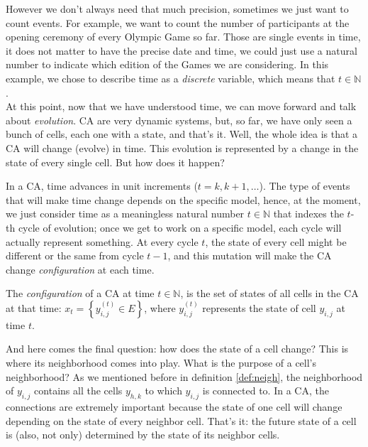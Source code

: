 However we don't always need that much precision, sometimes we just want to count events. For example,
we want to count the number of participants at the opening ceremony of every Olympic Game so far.
Those are single events in time, it does not matter to have the precise date and time, we could
just use a natural number to indicate which edition of the Games we are considering. In this example,
we chose to describe time as a \textit{discrete} variable, which means that $t \in \mathbb{N}$.\\

At this point, now that we have understood time, we can move forward and talk about \textit{evolution}.
CA are very dynamic systems, but, so far, we have only seen a bunch of cells, each one with a state, and
that's it. Well, the whole idea is that a CA will change (evolve) in time. This evolution is
represented by a change in the state of every single cell. But how does it happen?

In a CA, time advances in unit increments ($t=k, k+1, \dots$). 
The type of events that will make time change depends on the specific model,
hence, at the moment, we just consider time as a meaningless natural number $t \in \mathbb{N}$
that indexes the $t$-th cycle of evolution; once we get to work on a specific model, each cycle will
actually represent something.
At every cycle $t$,
the state of every cell might be different or the same from cycle $t-1$, and this mutation will make
the CA change \textit{configuration} at each time.

\begin{definition}[CA configuration]
The \textit{configuration} of a CA at time $t \in \mathbb{N}$, is the set of states of all cells
in the CA at that time: $x_t = \left\{ y^{(t)}_{i,j} \in E \right\}$, where
$y^{(t)}_{i,j}$ represents the state of cell $y_{i,j}$ at time $t$.
\end{definition}

And here comes the final question: how does the state of a cell change? This is where its
neighborhood comes into play.
What is the purpose of a cell's neighborhood? As we mentioned before in definition \ref{def:neigh},
the neighborhood of $y_{i,j}$ contains all the cells $y_{h,k}$ to which $y_{i,j}$ is connected to.
In a CA, the connections are extremely important because the state of one cell will change depending
on the state of every neighbor cell. That's it: the future state of a cell is (also, not only)
determined by the state of its neighbor cells.

